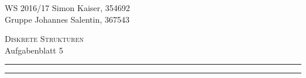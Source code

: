 \documentclass[a4paper,graphics,11pt]{article}
\newcommand\aufgabe[1]{\subsection*{Aufgabe #1}}
\newcommand\aufgabenteil[1]{\subsubsection*{#1}}
\begin{document}
\noindent WS 2016/17        							\hfill Simon Kaiser, 354692 \\
\noindent Gruppe                       \hfill Johannes Salentin, 367543 \\

\begin{center}
\Large \textsc{Diskrete Strukturen} \\   %
\large Aufgabenblatt 5                        %
\end{center}
\begin{center}
\rule[0.5ex]{\textwidth}{0.6pt}\vspace*{-\baselineskip}\vspace{3.2pt}
\rule[0.5ex]{\textwidth}{1.6pt}\\
\end{center}


%
% 
\end{document}
